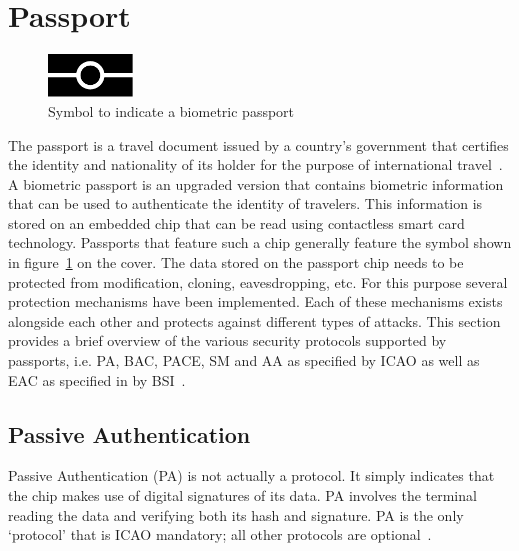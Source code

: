 \section{Passport}
\label{subsec:passports}
\setlength{\columnsep}{16pt}
\begin{figure}
  \centering
	\includegraphics[width=0.2\textwidth]{images/biometrics_logo.pdf}
	\caption{Symbol to indicate a biometric passport}
	\label{fig:biometricslogo}
\end{figure}
The passport is a travel document issued by a country's government that certifies the identity and nationality of its holder for the purpose of international travel~\cite{passportdefinition}. A biometric passport is an upgraded version that contains biometric information that can be used to authenticate the identity of travelers. This information is stored on an embedded chip that can be read using contactless smart card technology. Passports that feature such a chip generally feature the symbol shown in figure~\ref{fig:biometricslogo} on the cover. The data stored on the passport chip needs to be protected from modification, cloning, eavesdropping, etc. For this purpose several protection mechanisms have been implemented. Each of these mechanisms exists alongside each other and protects against different types of attacks. This section provides a brief overview of the various security protocols supported by passports, i.e. PA, BAC, PACE, SM and AA as specified by ICAO as well as EAC as specified in by BSI~\cite{icao,bsi}. 

\subsection{Passive Authentication}
\setlength{\columnsep}{10pt}
\label{subsubsec:pa}
Passive Authentication (PA) is not actually a protocol. It simply indicates that the chip makes use of digital signatures of its data. PA involves the terminal reading the data and verifying both its hash and signature. PA is the only `protocol' that is ICAO mandatory; all other protocols are optional~\cite{mostowski2010electronic}.

